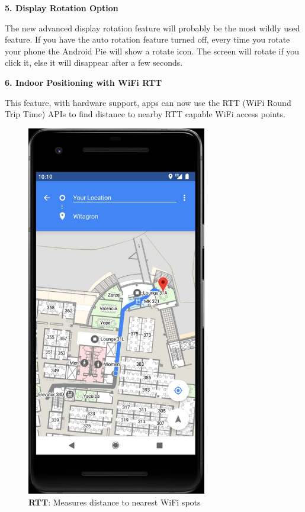 \documentclass[12pt]{article}
\begin{document}
\textbf{\textcolor[HTML]{4A4A4A}{5. Display Rotation Option}}\par

\textcolor[HTML]{4A4A4A}{The new advanced display rotation feature will probably be the most wildly used feature. If you have the auto rotation feature turned off, every time you rotate your phone the Android Pie will show a rotate icon. The screen will rotate if you click it, else it will disappear after a few seconds.}\par

\textbf{\textcolor[HTML]{4A4A4A}{6. Indoor Positioning with WiFi RTT}}\par
\textcolor[HTML]{4A4A4A}{This feature, with hardware support, apps can now use the RTT (WiFi Round Trip Time) APIs to find distance to nearby RTT capable WiFi access points.}\par

\begin{figure}[ht!]
\begin{center}
\centering

\includegraphics[trim ={1.75cm 10cm 1.75cm 10cm}, clip, width=0.7\textwidth]{RTT}
\caption{\textbf{RTT}: Measures distance to nearest WiFi spots}
\end{center}
\end{figure}
\end{document}
